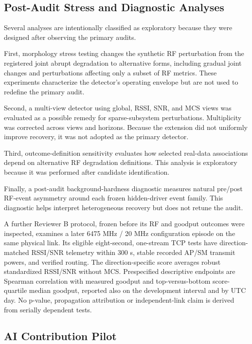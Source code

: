 \documentclass{ieeeaccess}
\begin{document}
\subsection{Post-Audit Stress and Diagnostic Analyses}\label{post-audit-stress-and-diagnostic-analyses}

Several analyses are intentionally classified as exploratory because they were designed after observing the primary audits.

First, morphology stress testing changes the synthetic RF perturbation from the registered joint abrupt degradation to alternative forms, including gradual joint changes and perturbations affecting only a subset of RF metrics. These experiments characterize the detector's operating envelope but are not used to redefine the primary audit.

Second, a multi-view detector using global, RSSI, SNR, and MCS views was evaluated as a possible remedy for sparse-subsystem perturbations. Multiplicity was corrected across views and horizons. Because the extension did not uniformly improve recovery, it was not adopted as the primary detector.

Third, outcome-definition sensitivity evaluates how selected real-data associations depend on alternative RF degradation definitions. This analysis is exploratory because it was performed after candidate identification.

Finally, a post-audit background-hardness diagnostic measures natural pre/post RF-event asymmetry around each frozen hidden-driver event family. This diagnostic helps interpret heterogeneous recovery but does not retune the audit.

A further Reviewer B protocol, frozen before its RF and goodput outcomes were inspected, examines a later 6475 MHz / 20 MHz configuration episode on the same physical link. Its eligible eight-second, one-stream TCP tests have direction-matched RSSI/SNR telemetry within 300 s, stable recorded AP/SM transmit powers, and verified routing. The direction-specific score averages robust standardized RSSI/SNR without MCS. Prespecified descriptive endpoints are Spearman correlation with measured goodput and top-versus-bottom score-quartile median goodput, reported also on the development interval and by UTC day. No p-value, propagation attribution or independent-link claim is derived from serially dependent tests.

\subsection{AI Contribution Pilot}\label{ai-contribution-pilot}
\end{document}
